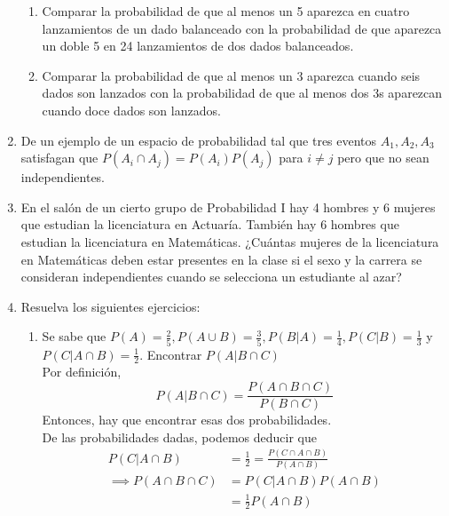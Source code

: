 \documentclass[12pt,a4paper]{report}
\begin{document}
\begin{enumerate}
{\begin{enumerate}[label=\alph*) ]
    \item{Comparar la probabilidad de que al menos un 5 aparezca en cuatro lanzamientos de un dado balanceado con la probabilidad de que aparezca un doble 5 en 24 lanzamientos de dos dados balanceados.} \\
    \item{Comparar la probabilidad de que al menos un 3 aparezca cuando seis dados son lanzados con la probabilidad de que al menos dos 3s aparezcan cuando doce dados son lanzados.}
    \end{enumerate}
	}


   \item {
   De un ejemplo de un espacio de probabilidad tal que tres eventos $A_{1},A_{2},A_{3}$ satisfagan que $P(A_{i}\cap A_{j})=P(A_{i})P(A_{j})$ para $i\neq j$ pero que no sean independientes.\\
	}

   \item {En el salón de un cierto grupo de Probabilidad I hay 4 hombres y 6 mujeres que estudian la licenciatura en Actuaría. También hay 6 hombres que estudian la licenciatura en Matemáticas. ¿Cuántas mujeres de la licenciatura en Matemáticas deben estar presentes en la clase si el sexo y la carrera se consideran independientes cuando se selecciona un estudiante al azar?
	}

  \item{
		 Resuelva los siguientes ejercicios:\\
		 \begin{enumerate}[label=\alph*) ]
		 \item{
			Se sabe que $P(A)= \frac{2}{5},P(A\cup B)=\frac{3}{5},P(B|A)=\frac{1}{4},P(C|B)=\frac{1}{3}$ y $P(C|A\cap B)=\frac{1}{2}$. Encontrar $P(A|B\cap C)$\\

			Por definición,
			\begin{equation*}
				P(A|B \cap C) = \frac{P(A \cap B \cap C)}{P(B \cap C)}
			\end{equation*}
			Entonces, hay que encontrar esas dos probabilidades.\\

			De las probabilidades dadas, podemos deducir que
			\begin{align*}
				P(C|A\cap B) &= \frac{1}{2} = \frac{P(C \cap A \cap B)}{P(A \cap B)}  \\
				\implies  P(A \cap B \cap C) &= P(C|A\cap B) P(A \cap B)\\
																		 &= \frac{1}{2} P(A \cap B)
			\end{align*}

}
\end{enumerate}}
\end{enumerate}
\end{document}
